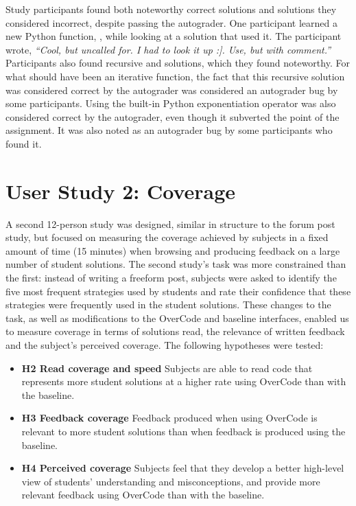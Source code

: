 Study participants found both noteworthy correct solutions and solutions they considered incorrect, despite passing the autograder. One participant learned a new Python function, , while looking at a solution that used it. The participant wrote, \textit{``Cool, but uncalled for. I had to look it up :]. Use, but with comment.''} Participants also found recursive  and  solutions, which they found noteworthy. For what should have been an iterative  function, the fact that this recursive solution was considered correct by the autograder was considered an autograder bug by some participants. Using the built-in Python exponentiation operator \codevar{**} was also considered correct by the autograder, even though it subverted the point of the assignment. It was also noted as an autograder bug by some participants who found it.
\section{User Study 2: Coverage}

A second 12-person study was designed, similar in structure to the forum post study, but focused on measuring the coverage achieved by subjects in a fixed amount of time (15 minutes) when browsing and producing feedback on a large number of student solutions. The second study's task was more constrained than the first: instead of writing a freeform post, subjects were asked to identify the five most frequent strategies used by students and rate their confidence that these strategies were frequently used in the student solutions. These changes to the task, as well as modifications to the OverCode and baseline interfaces, enabled us to measure coverage in terms of solutions read, the relevance of written feedback and the subject's perceived coverage. The following hypotheses were tested:

\begin{itemize}
\item {\bf H2 Read coverage and speed} Subjects are able to read code that represents more student solutions at a higher rate using OverCode than with the baseline. 

\item {\bf H3 Feedback coverage} Feedback produced when using OverCode is relevant to more student solutions than when feedback is produced using the baseline.

\item {\bf H4 Perceived coverage} Subjects feel that they develop a better high-level view of students' understanding and misconceptions, and provide more relevant feedback using OverCode than with the baseline.

\end{itemize}


